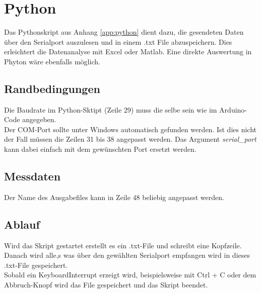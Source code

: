 \section{Python}
Das Pythonskript aus Anhang \ref{app:python} dient dazu, die gesendeten Daten über den Serialport auszulesen und in einem .txt File abzuspeichern. Dies erleichtert die Datenanalyse mit Excel oder Matlab. Eine direkte Auswertung in Phyton wäre ebenfalls möglich.\\

\subsection{Randbedingungen}
Die Baudrate im Python-Sktipt (Zeile 29) muss die selbe sein wie im Arduino-Code angegeben.\\
Der COM-Port sollte unter Windows automatisch gefunden werden. Ist dies nicht der Fall müssen die Zeilen 31 bis 38 angepasst werden. Das Argument \textit{serial\_port} kann dabei einfach mit dem gewünschten Port ersetzt werden.

\subsection{Messdaten}
Der Name des Ausgabefiles kann in Zeile 48 beliebig angepasst werden.

\subsection{Ablauf}
Wird das Skript gestartet erstellt es ein \*.txt-File und schreibt eine Kopfzeile.
Danach wird alle,s was über den gewählten Serialport empfangen wird in dieses .txt-File gespeichert.\\
Sobald ein KeyboardInterrupt erzeigt wird, beispielsweise mit Ctrl + C oder dem Abbruch-Knopf wird das File gespeichert und das Skript beendet.